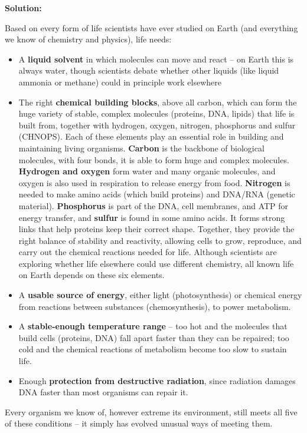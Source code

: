 \documentclass[12pt]{article}
\newenvironment{solution}{%
  \begin{solutionbox}\textbf{Solution:}
}{%
  \end{solutionbox}
}
\begin{document}
\begin{solution}
Based on every form of life scientists have ever studied on Earth (and everything we know of chemistry and physics), life needs: 
\begin{itemize}
  \item A \textbf{liquid solvent} in which molecules can move and react -- on Earth this is always water, though scientists debate whether other liquids (like liquid ammonia or methane) could in principle work elsewhere
  \item The right \textbf{chemical building blocks}, above all carbon, which can form the huge variety of stable, complex molecules (proteins, DNA, lipids) that life is built from, together with hydrogen, oxygen, nitrogen, phosphorus and sulfur (CHNOPS). Each of these elements play an essential role in building and maintaining living organisms. \textbf{Carbon} is the backbone of biological molecules, with four bonds, it is able to form huge and complex molecules. \textbf{Hydrogen and oxygen} form water and many organic molecules, and oxygen is also used in respiration to release energy from food. \textbf{Nitrogen} is needed to make amino acids (which build proteins) and DNA/RNA (genetic material). \textbf{Phosphorus} is part of the DNA, cell membranes, and ATP for energy transfer, and \textbf{sulfur} is found in some amino acids. It forms strong links that help proteins keep their correct shape. Together, they provide the right balance of stability and reactivity, allowing cells to grow, reproduce, and carry out the chemical reactions needed for life. Although scientists are exploring whether life elsewhere could use different chemistry, all known life on Earth depends on these six elements.

  \item A \textbf{usable source of energy}, either light (photosynthesis) or chemical energy from reactions between substances (chemosynthesis), to power metabolism.

  \item A \textbf{stable-enough temperature range} -- too hot and the molecules that build cells (proteins, DNA) fall apart faster than they can be repaired; too cold and the chemical reactions of metabolism become too slow to sustain life.

  \item Enough \textbf{protection from destructive radiation}, since radiation damages DNA faster than most organisms can repair it. 
\end{itemize}
Every organism we know of, however extreme its environment, still meets all five of these conditions -- it simply has evolved unusual ways of meeting them.
\end{solution}
\end{document}
